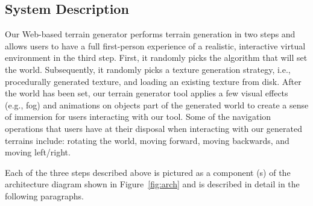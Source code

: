 \subsection{System Description}
Our Web-based terrain generator performs terrain generation in two steps and allows users to have a full first-person experience of a realistic, interactive virtual environment in the third step. First, it randomly picks the algorithm that will set the world. Subsequently, it randomly picks a texture generation strategy, i.e., procedurally generated texture, and loading an existing texture from disk. After the world has been set, our terrain generator tool applies a few visual effects (e.g., fog) and animations on objects part of the generated world to create a sense of immersion for users interacting with our tool. Some of the navigation operations that users have at their disposal when interacting with our generated terrains include: rotating the world, moving forward, moving backwards, and moving left/right.  

Each of the three steps described above is pictured as a component (s) of the architecture diagram shown in Figure~\ref{fig:arch} and is described in detail in the following paragraphs.

